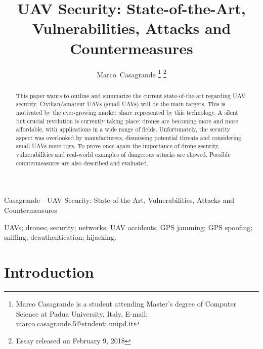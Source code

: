 \documentclass[journal]{IEEEtran}
\begin{document}
\title{UAV Security: State-of-the-Art, Vulnerabilities, Attacks and Countermeasures}

\author{Marco~Casagrande
\thanks{Marco Casagrande is a student attending Master's degree of Computer Science at Padua University, Italy. E-mail: marco.casagrande.5@studenti.unipd.it}
\thanks{Essay released on February 9, 2018}}


{Casagrande - UAV Security: State-of-the-Art, Vulnerabilities, Attacks and Countermeasures}

\maketitle

\begin{abstract}
This paper wants to outline and summarize the current state-of-the-art regarding UAV security. Civilian/amateur UAVs (small UAVs) will be the main targets. This is motivated by the ever-growing market share represented by this technology. A silent but crucial revolution is currently taking place: drones are becoming more and more affordable, with applications in a wide range of fields. Unfortunately, the security aspect was overlooked by manufacturers, dismissing potential threats and considering small UAVs mere toys. To prove once again the importance of drone security, vulnerabilities and real-world examples of dangerous attacks are showed. Possible countermeasures are also described and evaluated.
\end{abstract}

\begin{IEEEkeywords}
UAVs; drones; security; networks; UAV accidents; GPS jamming; GPS spoofing; sniffing; deauthentication; hijacking.
\end{IEEEkeywords}

\IEEEpeerreviewmaketitle



\section{Introduction}
\end{document}
